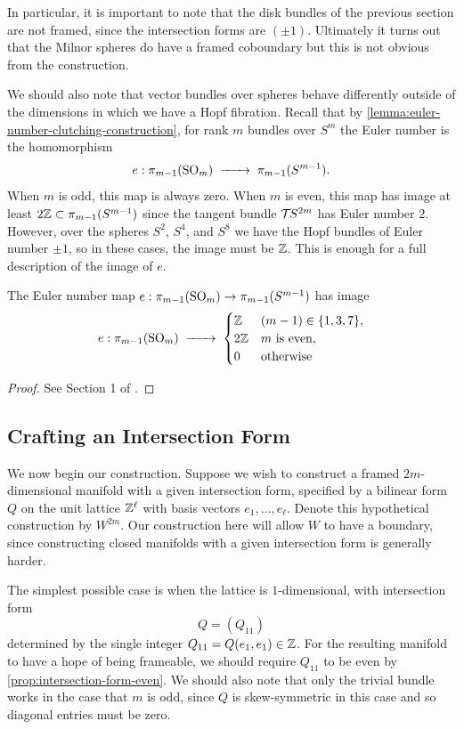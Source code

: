 In particular, it is important to note that the disk bundles of the previous section are not framed, since the intersection forms are $(\pm 1)$. Ultimately it turns out that the Milnor spheres do have a framed coboundary but this is not obvious from the construction.

We should also note that vector bundles over spheres behave differently outside of the dimensions in which we have a Hopf fibration. Recall that by \cref{lemma:euler-number-clutching-construction}, for rank $m$ bundles over $S^m$ the Euler number is the homomorphism
\[
	e : \pi_{m-1}(\SO_m) \lkxto \pi_{m-1}(S^{m-1}).
\]
When $m$ is odd, this map is always zero. When $m$ is even, this map has image at least $2\mathbb{Z}\subset \pi_{m-1}(S^{m-1})$ since the tangent bundle ${\mathcal{T}\hspace{-0.1em}} S^{2m}$ has Euler number $2$. However, over the spheres $S^2$, $S^4$, and $S^8$ we have the Hopf bundles of Euler number $\pm 1$, so in these cases, the image must be $\mathbb{Z}$. This is enough for a full description of the image of $e$.

\begin{proposition}\label{thm:possible-euler-numbers-over-spheres}
	The Euler number map $e : \pi_{m-1}(\mathrm{SO}_m) \to \pi_{m-1}(S^{m-1})$ has image
	\[
		e : \pi_{m-1}(\SO_m) \lkxto
		\begin{cases}
			\Z  & (m-1)\in\{1,3,7\},  \\
			2\Z & m\textrm{ is even}, \\
			0   & \textrm{otherwise}\end{cases}
	\]
\end{proposition}
\begin{proof}
	See Section 1 of \cite{levine1985lectures}.
\end{proof}

\subsection{Crafting an Intersection Form}

We now begin our construction.
Suppose we wish to construct a framed $2m$-dimensional manifold with a given intersection form, specified by a bilinear form $Q$ on the unit lattice $\mathbb{Z}^\ell$ with basis vectors $e_1,\ldots, e_\ell$. Denote this hypothetical construction by $W^{2m}$. Our construction here will allow $W$ to have a boundary, since constructing closed manifolds with a given intersection form is generally harder.

The simplest possible case is when the lattice is $1$-dimensional, with intersection form
\[
	Q =  (Q_{11})
\]
determined by the single integer $Q_{11}=Q(e_1,e_1)\in \mathbb{Z}$.
For the resulting manifold to have a hope of being frameable, we should require $Q_{11}$ to be even by \cref{prop:intersection-form-even}. We should also note that only the trivial bundle works in the case that $m$ is odd, since $Q$ is skew-symmetric in this case and so diagonal entries must be zero.

